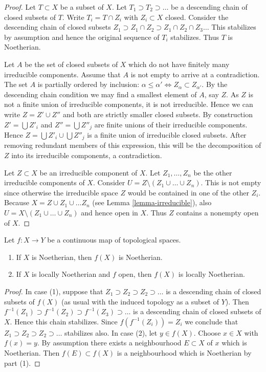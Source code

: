 \begin{proof}
Let $T \subset X$ be a subset of $X$.
Let $T_1 \supset T_2 \supset \ldots$
be a descending chain of closed subsets of $T$.
Write $T_i =  T \cap Z_i$ with $Z_i \subset X$ closed.
Consider the descending chain of closed subsets
$Z_1 \supset Z_1\cap Z_2 \supset Z_1 \cap Z_2 \cap Z_3 \ldots$
This stabilizes by assumption and hence the original sequence
of $T_i$ stabilizes. Thus $T$ is Noetherian.

\medskip\noindent
Let $A$ be the set of closed subsets of $X$ which do not
have finitely many irreducible components. Assume that
$A$ is not empty to arrive at a contradiction.
The set $A$ is partially ordered by inclusion: $\alpha \leq \alpha'
\Leftrightarrow Z_{\alpha} \subset Z_{\alpha'}$.
By the descending chain condition we may find a
smallest element of $A$, say $Z$. As $Z$ is not a finite
union of irreducible components, it is not irreducible.
Hence we can write $Z = Z' \cup Z''$ and both are strictly smaller
closed subsets. By construction $Z' = \bigcup Z'_i$ and
$Z'' = \bigcup Z''_j$ are finite unions of their irreducible
components. Hence $Z = \bigcup Z'_i \cup \bigcup Z''_j$ is
a finite union of irreducible closed subsets.
After removing redundant members of this expression,
this will be the decomposition of $Z$ into its irreducible
components, a contradiction.

\medskip\noindent
Let $Z \subset X$ be an irreducible component of $X$.
Let $Z_1, \ldots, Z_n$ be the other irreducible components
of $X$. Consider $U = Z \setminus (Z_1\cup\ldots\cup Z_n)$.
This is not empty since otherwise the irreducible space
$Z$ would be contained in one of the other $Z_i$.
Because $X = Z \cup Z_1 \cup \ldots Z_n$ (see Lemma \ref{lemma-irreducible}),
also $U = X \setminus (Z_1\cup\ldots\cup Z_n)$
and hence open in $X$. Thus $Z$ contains a nonempty
open of $X$.
\end{proof}

\begin{lemma}
\label{lemma-image-Noetherian}
Let $f : X \to Y$ be a continuous map of topological spaces.
\begin{enumerate}
\item If $X$ is Noetherian, then $f(X)$ is Noetherian.
\item If $X$ is locally Noetherian and $f$ open, then $f(X)$ is
locally Noetherian.
\end{enumerate}
\end{lemma}

\begin{proof}
In case (1), suppose that $Z_1 \supset Z_2 \supset Z_2 \supset \ldots$
is a descending chain of closed subsets of $f(X)$ (as usual with the induced
topology as a subset of $Y$). Then
$f^{-1}(Z_1) \supset f^{-1}(Z_2) \supset f^{-1}(Z_3) \supset \ldots$ is
a descending chain of closed subsets of $X$. Hence this chain stabilizes.
Since $f(f^{-1}(Z_i)) = Z_i$ we conclude that
$Z_1 \supset Z_2 \supset Z_2 \supset \ldots$
stabilizes also. In case (2), let $y \in f(X)$. Choose $x \in X$ with
$f(x) = y$. By assumption there exists a neighbourhood $E \subset X$ of
$x$ which is Noetherian. Then $f(E) \subset f(X)$ is a neighbourhood
which is Noetherian by part (1).
\end{proof}

